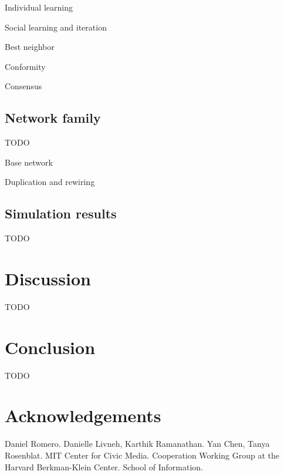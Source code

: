 \documentclass[10pt,twocolumn]{article}
\begin{document}
Individual learning

Social learning and iteration

Best neighbor

Conformity

Consensus

\subsection{Network family}

TODO

Base network

Duplication and rewiring

\subsection{Simulation results}

TODO

\section{Discussion}
TODO

\section{Conclusion}
TODO

\section{Acknowledgements}
Daniel Romero.
Danielle Livneh, Karthik Ramanathan.
Yan Chen, Tanya Rosenblat.
MIT Center for Civic Media.
Cooperation Working Group at the Harvard Berkman-Klein Center.
School of Information.

%



 
\end{document}
